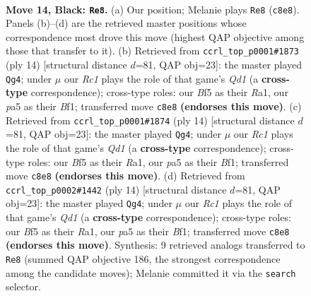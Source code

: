 \documentclass[11pt]{article}
\begin{document}
\clearpage

\begin{figure}[p]\centering
\begin{subfigure}{0.46\textwidth}\centering
\resizebox{\linewidth}{!}{%
\newchessgame
\chessboard[
  setfen={rnr3k1/ppp1bp1p/3q2p1/P2pNb2/3P1P1P/6P1/1P2P3/RNBQ1RK1 b - - 0 14},
  showmover=false,
  pgfstyle=straightmove, color=movearrow, markmove={c8-e8}
]}
\caption{}
\end{subfigure}\hfill
\begin{subfigure}{0.46\textwidth}\centering
\resizebox{\linewidth}{!}{%
\newchessgame
\chessboard[
  setfen={rnbqk2r/ppp2pp1/4p2p/3pP3/3Pn3/2P5/P1PB1PPP/R2QKBNR w KQkq - 1 8},
  showmover=false,
  pgfstyle=straightmove, color=movearrow, markmove={d1-g4}
]}
\caption{}
\end{subfigure}
\\[4pt]
\begin{subfigure}{0.46\textwidth}\centering
\resizebox{\linewidth}{!}{%
\newchessgame
\chessboard[
  setfen={rnbqk2r/ppp2pp1/4p2p/3pP3/3Pn3/2P5/P1PB1PPP/R2QKBNR w KQkq - 1 8},
  showmover=false,
  pgfstyle=straightmove, color=movearrow, markmove={d1-g4}
]}
\caption{}
\end{subfigure}\hfill
\begin{subfigure}{0.46\textwidth}\centering
\resizebox{\linewidth}{!}{%
\newchessgame
\chessboard[
  setfen={rnbqk2r/ppp2pp1/4p2p/3pP3/3Pn3/2P5/P1PB1PPP/R2QKBNR w KQkq - 1 8},
  showmover=false,
  pgfstyle=straightmove, color=movearrow, markmove={d1-g4}
]}
\caption{}
\end{subfigure}
\caption{\textbf{Move 14, Black: \texttt{Re8}.} (a) Our position; Melanie plays \texttt{Re8} (\texttt{c8e8}). Panels (b)--(d) are the retrieved master positions whose correspondence most drove this move (highest QAP objective among those that transfer to it). (b) Retrieved from \texttt{ccrl\_top\_p0001\#1873} (ply 14) [structural distance $d$=81, QAP obj=23]: the master played \texttt{Qg4}; under $\mu$ our \emph{Rc1} plays the role of that game's \emph{Qd1} (a \textbf{cross-type} correspondence); cross-type roles: our \emph{B}f5 as their \emph{R}a1, our \emph{p}a5 as their \emph{B}f1; transferred move \texttt{c8e8} \textbf{(endorses this move)}. (c) Retrieved from \texttt{ccrl\_top\_p0001\#1874} (ply 14) [structural distance $d$=81, QAP obj=23]: the master played \texttt{Qg4}; under $\mu$ our \emph{Rc1} plays the role of that game's \emph{Qd1} (a \textbf{cross-type} correspondence); cross-type roles: our \emph{B}f5 as their \emph{R}a1, our \emph{p}a5 as their \emph{B}f1; transferred move \texttt{c8e8} \textbf{(endorses this move)}. (d) Retrieved from \texttt{ccrl\_top\_p0002\#1442} (ply 14) [structural distance $d$=81, QAP obj=23]: the master played \texttt{Qg4}; under $\mu$ our \emph{Rc1} plays the role of that game's \emph{Qd1} (a \textbf{cross-type} correspondence); cross-type roles: our \emph{B}f5 as their \emph{R}a1, our \emph{p}a5 as their \emph{B}f1; transferred move \texttt{c8e8} \textbf{(endorses this move)}. Synthesis: 9 retrieved analogs transferred to \texttt{Re8} (summed QAP objective 186, the strongest correspondence among the candidate moves); Melanie committed it via the \texttt{search} selector.}
\label{fig:thought-m27}
\end{figure}
\end{document}
